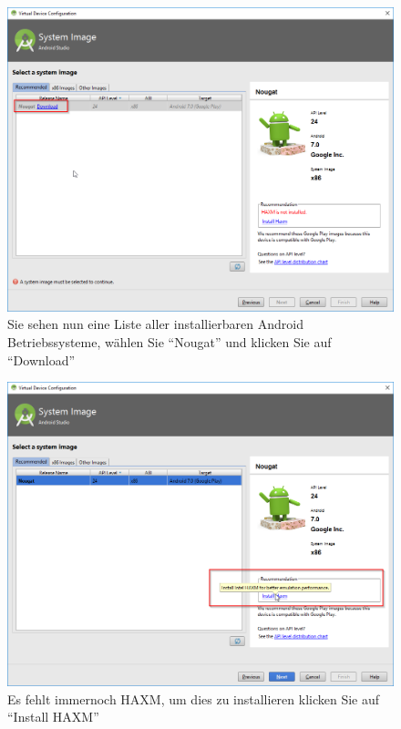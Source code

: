 \documentclass[a4paper,10pt,xetex]{article}
\begin{document}
\begin{figure}
  \centering
  \includegraphics[width=\textwidth]{Installation/3-2}
  \caption{Sie sehen nun eine Liste aller installierbaren Android Betriebssysteme, wählen Sie ``Nougat'' und klicken Sie auf ``Download''}
\end{figure}

\begin{figure}
  \centering
  \includegraphics[width=\textwidth]{Installation/3-3}
  \caption{Es fehlt immernoch HAXM, um dies zu installieren klicken Sie auf ``Install HAXM'' }
\end{figure}
\end{document}
